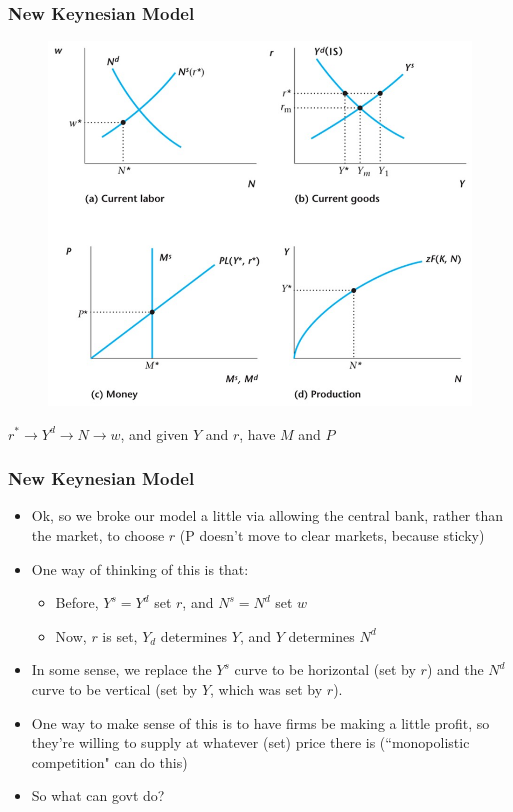 \documentclass{beamer}
\begin{document}
\begin{frame}
\frametitle[alignment=center]{New Keynesian Model}
\begin{figure}
\centering
\includegraphics[scale=0.65]{Figures/W_Fig_14pt1.png}
\end{figure}
$r^*\rightarrow Y^d\rightarrow N\rightarrow w$, and given $Y$ and $r$, have $M$ and $P$
\end{frame}

\begin{frame}
\frametitle[alignment=center]{New Keynesian Model}
\begin{itemize}
\item Ok, so we broke our model a little via allowing the central bank, rather than the market, to choose $r$ (P doesn't move to clear markets, because sticky)
\bigskip
\item One way of thinking of this is that:
\begin{itemize}
\item Before, $Y^s=Y^d$ set $r$, and $N^s=N^d$ set $w$
\item Now, $r$ is set, $Y_d$ determines $Y$, and $Y$ determines $N^d$
\end{itemize}
\item In some sense, we replace the $Y^s$ curve to be horizontal (set by $r$) and the $N^d$ curve to be vertical (set by $Y$, which was set by $r$). 
\bigskip
\item One way to make sense of this is to have firms be making a little profit, so they're willing to supply at whatever (set) price there is (``monopolistic competition" can do this)
\bigskip
\item So what can govt do?
\end{itemize}
\end{frame}
\end{document}

